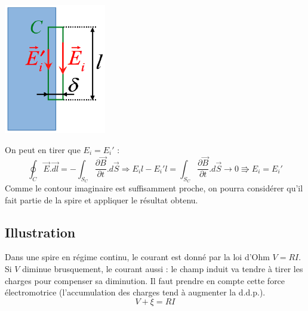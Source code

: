 \documentclass	[11pt, a4paper, openany]{book}
\begin{document}
\begin{center}
	\includegraphics[scale=0.47]{em/image21.png}\\
\end{center}
On peut en tirer que $E_i = E_i'$ :
\begin{equation}
	\oint_C \vec{E}.\vec{dl} = -\int_{S_C}\frac{\partial\vec{B}}{\partial t}.d\vec{S} \Rightarrow E_il - E_i'l = \int_{S_C} \frac{\partial\vec{B}}{\partial t}.d\vec{S} \rightarrow 0 \Rrightarrow E_i = E_i'
\end{equation}
Comme le contour imaginaire est suffisamment proche, on pourra considérer qu'il fait partie de la spire et appliquer le résultat obtenu.

\subsection{Illustration}
Dans une spire en régime continu, le courant est donné par la loi d'Ohm $ V = RI$. Si $V$ diminue brusquement, le courant aussi : le champ induit va tendre à tirer les charges pour compenser sa diminution. Il faut prendre en compte cette force électromotrice (l'accumulation des charges tend à augmenter la d.d.p.).
\begin{equation}
	V + \xi = RI
\end{equation}
\end{document}
